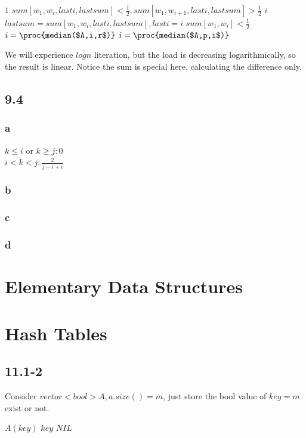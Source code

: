 \documentclass[]{article}
\begin{document}
\begin{codebox}
	\li \While $1$
	\li		\Do \If $sum[w_{1}, w_{i}, lasti, lastsum] < \frac{1}{2}, sum[w_{1}, w_{i+1}, lasti, lastsum] > \frac{1}{2}$
	\li 		\Then \Return $i$
 	\li  	\Else
 	\li 	$lastsum = sum[w_{1}, w_{i}, lasti, lastsum], lasti = i$
 	\li 	\If  $sum[w_{1}, w_{i}] < \frac{1}{2}$
 	\li  		\Then $i = \proc{median($A,i,r$)}$
 	\li 	\Else $i = \proc{median($A,p,i$)}$
 	\End
\end{codebox}

We will experience $logn$ literation, but the load is decreasing logarithmically, so the result is linear. Notice the sum is special here, calculating the difference only.

\subsection{9.4}
\subsubsection{a}
$k \le i $ or $ k \ge j: 0$\\
$i < k < j: \frac{2}{j-i+i}$
\subsubsection{b}
\subsubsection{c}
\subsubsection{d}

\section{Elementary Data Structures}

\section{Hash Tables}

\subsection{11.1-2}
Consider $vector<bool> A, a.size() = m$, just store the bool value of $key = m$ exist or not.

\begin{codebox}
	\li \If $A(key)$
	\li		\Then \Return $key$
	\li  \Else \Return $NIL$
	\End
\end{codebox}
\end{document}
